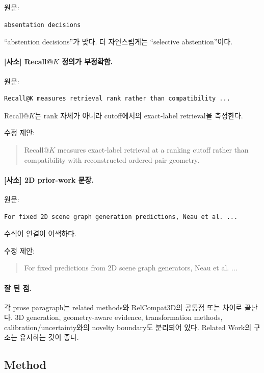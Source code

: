 \documentclass[11pt]{article}
\newcommand{\minor}{\textbf{\textcolor{minorblue}{[사소]}}}
\begin{document}
원문:
\begin{verbatim}
absentation decisions
\end{verbatim}

``abstention decisions''가 맞다. 더 자연스럽게는 ``selective abstention''이다.

\paragraph{\minor{} Recall@$K$ 정의가 부정확함.}

원문:
\begin{verbatim}
Recall@K measures retrieval rank rather than compatibility ...
\end{verbatim}

Recall@$K$는 rank 자체가 아니라 cutoff에서의 exact-label retrieval을 측정한다.

수정 제안:
\begin{quote}
Recall@$K$ measures exact-label retrieval at a ranking cutoff rather than
compatibility with reconstructed ordered-pair geometry.
\end{quote}

\paragraph{\minor{} 2D prior-work 문장.}

원문:
\begin{verbatim}
For fixed 2D scene graph generation predictions, Neau et al. ...
\end{verbatim}

수식어 연결이 어색하다.

수정 제안:
\begin{quote}
For fixed predictions from 2D scene graph generators, Neau et al. ...
\end{quote}

\paragraph{잘 된 점.}

각 prose paragraph는 related methods와 RelCompat3D의 공통점 또는 차이로 끝난다.
3D generation, geometry-aware evidence, transformation methods, calibration/uncertainty와의
novelty boundary도 분리되어 있다. Related Work의 구조는 유지하는 것이 좋다.

\subsection{Method}
\end{document}
